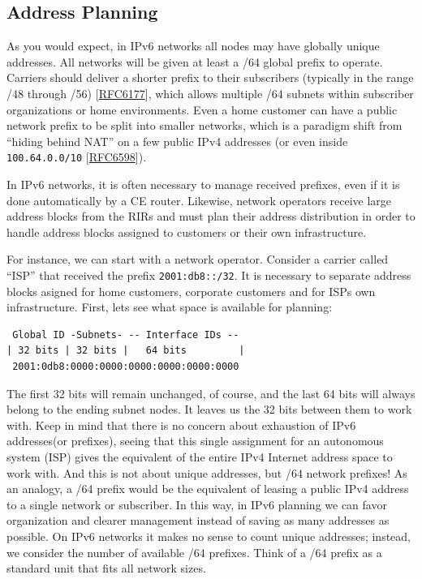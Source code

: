 \documentclass[
]{article}
\begin{document}
\pagebreak

\subsection{Address Planning}\label{address-planning}

As you would expect, in IPv6 networks all nodes may have globally unique
addresses. All networks will be given at least a /64 global prefix to
operate. Carriers should deliver a shorter prefix to their subscribers
(typically in the range /48 through /56)
{[}\href{https://www.rfc-editor.org/info/rfc6177}{RFC6177}{]}, which
allows multiple /64 subnets within subscriber organizations or home
environments. Even a home customer can have a public network prefix to
be split into smaller networks, which is a paradigm shift from ``hiding
behind NAT'' on a few public IPv4 addresses (or even inside
\texttt{100.64.0.0/10}
{[}\href{https://www.rfc-editor.org/info/rfc6598}{RFC6598}{]}).

In IPv6 networks, it is often necessary to manage received prefixes,
even if it is done automatically by a CE router. Likewise, network
operators receive large address blocks from the RIRs and must plan their
address distribution in order to handle address blocks assigned to
customers or their own infrastructure.

For instance, we can start with a network operator. Consider a carrier
called ``ISP'' that received the prefix \texttt{2001:db8::/32}. It is
necessary to separate address blocks asigned for home customers,
corporate customers and for ISP\textquotesingle s own infrastructure.
First, let\textquotesingle s see what space is available for planning:

\begin{verbatim}
 Global ID -Subnets- -- Interface IDs --
| 32 bits | 32 bits |   64 bits         |
 2001:0db8:0000:0000:0000:0000:0000:0000
\end{verbatim}

The first 32 bits will remain unchanged, of course, and the last 64 bits
will always belong to the ending subnet nodes. It leaves us the 32 bits
between them to work with. Keep in mind that there is no concern about
exhaustion of IPv6 addresses(or prefixes), seeing that this single
assignment for an autonomous system (ISP) gives the equivalent of the
entire IPv4 Internet address space to work with. And this is not about
unique addresses, but /64 network prefixes! As an analogy, a /64 prefix
would be the equivalent of leasing a public IPv4 address to a single
network or subscriber. In this way, in IPv6 planning we can favor
organization and clearer management instead of saving as many addresses
as possible. On IPv6 networks it makes no sense to count unique
addresses; instead, we consider the number of available /64 prefixes.
Think of a /64 prefix as a standard unit that fits all network sizes.
\end{document}
